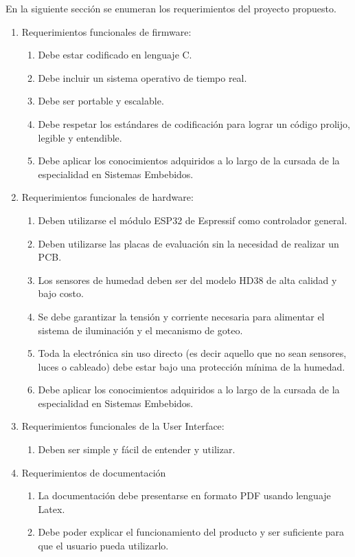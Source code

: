 \documentclass[
11pt, %
]{charter}
\begin{document}
En la siguiente sección se enumeran los requerimientos del proyecto propuesto.
\begin{enumerate}
	\item Requerimientos funcionales de firmware:
		\begin{enumerate}
			\item Debe estar codificado en lenguaje C.
			\item Debe incluir un sistema operativo de tiempo real.
			\item Debe ser portable y escalable.
			\item Debe respetar los estándares de codificación para lograr un código prolijo, legible y entendible.
			\item Debe aplicar los conocimientos adquiridos a lo largo de la cursada de la especialidad en Sistemas Embebidos.
		\end{enumerate}
	\item Requerimientos funcionales de hardware:
		\begin{enumerate}
			\item Deben utilizarse el módulo ESP32 de Espressif como controlador general.
			\item Deben utilizarse las placas de evaluación sin la necesidad de realizar un PCB.
			\item Los sensores de humedad deben ser del modelo HD38 de alta calidad y bajo costo.
			\item Se debe garantizar la tensión y corriente necesaria para alimentar el sistema de iluminación y el mecanismo de goteo.
			\item Toda la electrónica sin uso directo (es decir aquello que no sean sensores, luces o cableado) debe estar bajo una protección mínima de la humedad.
			\item Debe aplicar los conocimientos adquiridos a lo largo de la cursada de la especialidad en Sistemas Embebidos.
		\end{enumerate}
	\item Requerimientos funcionales de la User Interface:
		\begin{enumerate}
			\item Deben ser simple y fácil de entender y utilizar.
		\end{enumerate}
	\item Requerimientos de documentación
		\begin{enumerate}
			\item La documentación debe presentarse en formato PDF usando lenguaje Latex.
			\item Debe poder explicar el funcionamiento del producto y ser suficiente para que el usuario pueda utilizarlo.
		\end{enumerate}
\end{enumerate}
\end{document}
